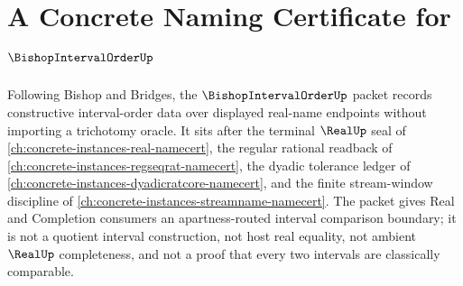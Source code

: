 \chapter{A Concrete Naming Certificate for $\BishopIntervalOrderUp$}
\label{ch:concrete-instances-bishop-interval-order-namecert}

Following Bishop and Bridges, the $\BishopIntervalOrderUp$ packet records constructive interval-order data over displayed real-name endpoints without importing a trichotomy oracle. It sits after the terminal $\RealUp$ seal of \autoref{ch:concrete-instances-real-namecert}, the regular rational readback of \autoref{ch:concrete-instances-regseqrat-namecert}, the dyadic tolerance ledger of \autoref{ch:concrete-instances-dyadicratcore-namecert}, and the finite stream-window discipline of \autoref{ch:concrete-instances-streamname-namecert}. The packet gives Real and Completion consumers an apartness-routed interval comparison boundary; it is not a quotient interval construction, not host real equality, not ambient $\RealUp$ completeness, and not a proof that every two intervals are classically comparable.

